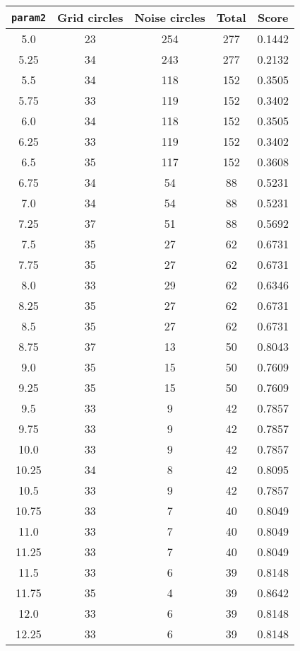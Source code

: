 \documentclass[letterpaper, 12pt]{article}
\begin{document}
\begin{longtable}{|c|c|c|c|c|}
\hline
\textbf{\texttt{param2}} & \textbf{Grid circles} & \textbf{Noise circles} & \textbf{Total} & \textbf{Score} \\
\hline
5.0 & 23 & 254 & 277 & 0.1442 \\
\hline
5.25 & 34 & 243 & 277 & 0.2132 \\
\hline
5.5 & 34 & 118 & 152 & 0.3505 \\
\hline
5.75 & 33 & 119 & 152 & 0.3402 \\
\hline
6.0 & 34 & 118 & 152 & 0.3505 \\
\hline
6.25 & 33 & 119 & 152 & 0.3402 \\
\hline
6.5 & 35 & 117 & 152 & 0.3608 \\
\hline
6.75 & 34 & 54 & 88 & 0.5231 \\
\hline
7.0 & 34 & 54 & 88 & 0.5231 \\
\hline
7.25 & 37 & 51 & 88 & 0.5692 \\
\hline
7.5 & 35 & 27 & 62 & 0.6731 \\
\hline
7.75 & 35 & 27 & 62 & 0.6731 \\
\hline
8.0 & 33 & 29 & 62 & 0.6346 \\
\hline
8.25 & 35 & 27 & 62 & 0.6731 \\
\hline
8.5 & 35 & 27 & 62 & 0.6731 \\
\hline
8.75 & 37 & 13 & 50 & 0.8043 \\
\hline
9.0 & 35 & 15 & 50 & 0.7609 \\
\hline
9.25 & 35 & 15 & 50 & 0.7609 \\
\hline
9.5 & 33 & 9 & 42 & 0.7857 \\
\hline
9.75 & 33 & 9 & 42 & 0.7857 \\
\hline
10.0 & 33 & 9 & 42 & 0.7857 \\
\hline
10.25 & 34 & 8 & 42 & 0.8095 \\
\hline
10.5 & 33 & 9 & 42 & 0.7857 \\
\hline
10.75 & 33 & 7 & 40 & 0.8049 \\
\hline
11.0 & 33 & 7 & 40 & 0.8049 \\
\hline
11.25 & 33 & 7 & 40 & 0.8049 \\
\hline
11.5 & 33 & 6 & 39 & 0.8148 \\
\hline
11.75 & 35 & 4 & 39 & 0.8642 \\
\hline
12.0 & 33 & 6 & 39 & 0.8148 \\
\hline
12.25 & 33 & 6 & 39 & 0.8148 \\
\hline

\end{longtable}
\end{document}
